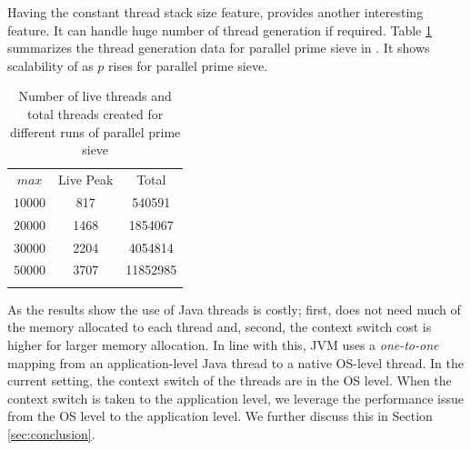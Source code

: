 Having the constant thread stack size feature, \Crisp provides another interesting feature. It can handle huge number of thread generation if required. Table \ref{tbl:cmp-thread-num-gen} summarizes the thread generation data for parallel prime sieve in \Crisp. It shows scalability of \Crisp as $p$ rises for parallel prime sieve.
\begin{table}[b]\scriptsize
\begin{center}
\begin{tabular}{c c c}
$max$ & Live Peak & Total \\ \thickhline
$10000$ & 817 & 540591 \\
$20000$ & 1468 & 1854067 \\
$30000$ & 2204 & 4054814 \\
$50000$ & 3707 & 11852985 \\ \thickhline
\end{tabular}
\caption{Number of live threads and total threads created for different runs of parallel prime sieve}
\label{tbl:cmp-thread-num-gen}
\end{center}
\end{table}

As the results show the use of Java threads is costly; first, \Crisp
does not need much of the memory allocated to each thread and, second,
the context switch cost is higher for larger memory allocation. In line
with this, JVM uses a \emph{one-to-one} mapping from an
application-level Java thread to a native OS-level thread. 
In the current setting, the context switch of the threads are in
the OS level. When the context switch is taken to the application
level, we leverage the performance issue from the OS level to the
application level. We further discuss this in Section
\ref{sec:conclusion}.




